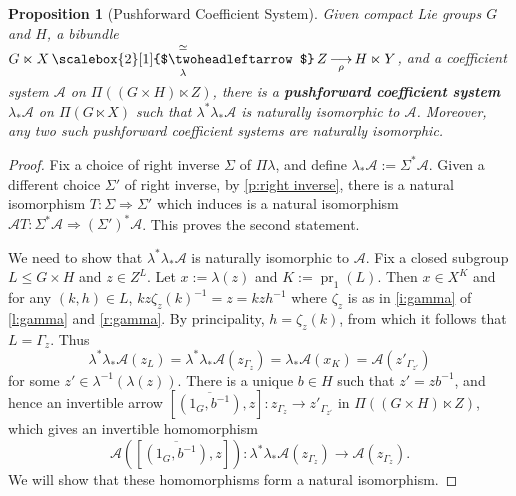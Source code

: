 \documentclass[12pt,reqno]{amsart}
\newcommand{\printname}[1]{}
\renewcommand{\printname}[1]
	{{\color{brown}{\makebox[0pt]{\hspace{-1in}\raisebox{8pt}{\tiny #1}}}}}
\newcommand{\labell}[1]{\label{#1} \printname{#1}}
\newcommand{\calA}{{\mathcal{A}}}
\newcommand{\pr}{{\operatorname{pr}}} %
\newcommand{\ot}[1]{{\,\underset{\raisebox{1mm}{$\scriptstyle{#1}$}}{\overset{\simeq}{\scalebox{2}[1]{$\twoheadleftarrow$}}}\,}} %
\newcommand{\uto}[1]{{\,\underset{\raisebox{1mm}{$\scriptstyle{#1}$}}{\longrightarrow}\,}} %
\theoremstyle{plain}
\newtheorem{proposition}[theorem]{Proposition}
\theoremstyle{definition}
\begin{document}
    \begin{proposition}[Pushforward Coefficient System]\labell{p:pushforward coeff system}
        Given compact Lie groups $G$ and $H$, a bibundle $G\ltimes X\ot{\lambda} Z\uto{\rho} H\ltimes Y$, and a coefficient system $\calA$ on $\Pi((G\times H)\ltimes Z)$, there is a \textbf{pushforward coefficient system} $\lambda_*\calA$ on $\Pi(G\ltimes X)$ such that $\lambda^*\lambda_*\calA$ is naturally isomorphic to $\calA$.  Moreover, any two such pushforward coefficient systems are naturally isomorphic.
    \end{proposition}

    \begin{proof}
        Fix a choice of right inverse $\Sigma$ of $\Pi\lambda$, and define $\lambda_*\calA:=\Sigma^*\calA$.  Given a different choice $\Sigma'$ of right inverse, by \cref{p:right inverse}, there is a natural isomorphism $T\colon\Sigma\Rightarrow\Sigma'$ which induces is a natural isomorphism $\calA T\colon\Sigma^*\calA\Rightarrow(\Sigma')^*\calA$.  This proves the second statement.

        We need to show that $\lambda^*\lambda_*\calA$ is naturally isomorphic to $\calA$.  Fix a closed subgroup $L\leq G\times H$ and $z\in Z^L$.  Let $x:=\lambda(z)$ and $K:=\pr_1(L)$.  Then $x\in X^K$ and for any $(k,h)\in L$, $kz\zeta_z(k)^{-1}=z=kzh^{-1}$ where $\zeta_z$ is as in \cref{i:gamma} of \cref{l:gamma} and \cref{r:gamma}.  By principality, $h=\zeta_z(k)$, from which it follows that $L=\Gamma_z$.  Thus $$\lambda^*\lambda_*\calA(z_L)=\lambda^*\lambda_*\calA(z_{\Gamma_z})=\lambda_*\calA(x_K)=\calA(z'_{\Gamma_{z'}})$$ 
        for some $z'\in\lambda^{-1}(\lambda(z))$.  There is a unique $b\in H$ such that $z'=zb^{-1}$, and hence an invertible arrow $\left[\overline{(1_G,b^{-1})},z\right]\colon z_{\Gamma_{z}}\to z'_{\Gamma_{z'}}$ in $\Pi((G\times H)\ltimes Z)$, which gives an invertible homomorphism $$\calA\left(\left[\overline{(1_G,b^{-1})},z\right]\right)\colon\lambda^*\lambda_*\calA( z_{\Gamma_{z}})\to \calA(z_{\Gamma_{z}}).$$  We will show that these homomorphisms form a natural isomorphism. 


\end{proof}
\end{document}
